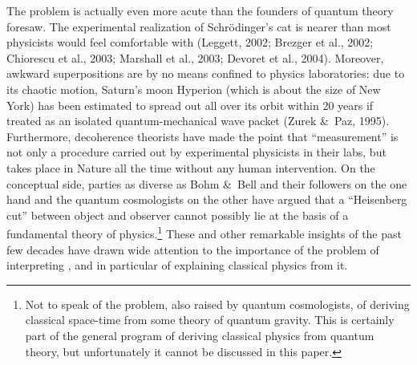 \documentclass[12pt]{article}
\begin{document}
The problem is actually even more acute than the founders of quantum theory foresaw. 
The experimental realization of  Schr\"{o}dinger's cat  is nearer than most physicists would feel comfortable with (Leggett, 2002;  Brezger et al., 2002; Chiorescu et al., 2003; 
Marshall et al., 2003;  Devoret et al., 2004). 
Moreover, awkward superpositions are by no means confined to physics 
 laboratories:  due to its chaotic motion, Saturn's moon Hyperion (which is about the size of New York) has been estimated to spread out all over its orbit within  20 years if treated as an isolated  quantum-mechanical wave packet (Zurek \&\ Paz, 1995). Furthermore, decoherence theorists have made the point  that ``measurement'' is not only a procedure carried out by experimental physicists in their labs, but takes place in Nature all the time without any human intervention. On the conceptual side, parties as diverse as  Bohm \&\ Bell and their followers on the one hand  and the quantum cosmologists on the other have argued
that a ``Heisenberg cut'' between object and observer cannot possibly lie at the basis of
a fundamental theory of physics.\footnote{Not to speak of the problem, also raised
by quantum cosmologists, of deriving classical space-time from some theory of quantum gravity. This is certainly part of the general program of deriving classical physics from quantum theory, but unfortunately it cannot be discussed in this paper. }
  These and other remarkable  insights of the past few decades have drawn wide attention to the importance of the problem of interpreting \qm, and in particular of explaining classical physics from it. 
\end{document}
